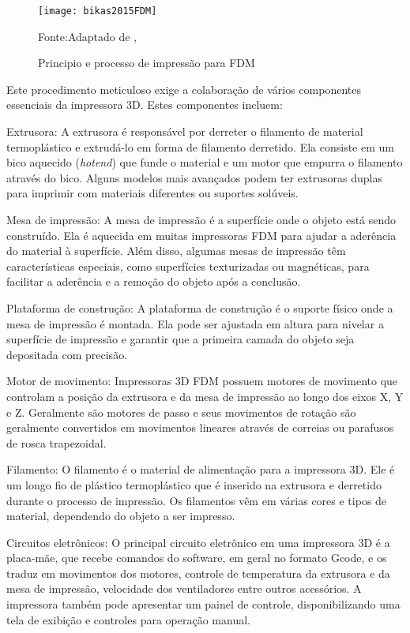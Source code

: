 \begin{figure}[H]
    \begin{center}
    \caption{Principio e processo de impressão para FDM}
    \texttt{[image: bikas2015FDM]}

    {\footnotesize Fonte:Adaptado de \citeauthor{bikas16}, \citeyear{bikas16}}
    \label{fig:fdm_ex}
    \end{center}
\end{figure}

Este procedimento meticuloso exige a colaboração de vários componentes essenciais da impressora 3D. Estes componentes incluem:

Extrusora: A extrusora é responsável por derreter o filamento de material termoplástico e extrudá-lo em forma de filamento derretido. Ela consiste em um bico aquecido (\textit{hotend}) que funde o material e um motor que empurra o filamento através do bico. Alguns modelos mais avançados podem ter extrusoras duplas para imprimir com materiais diferentes ou suportes solúveis.

Mesa de impressão: A mesa de impressão é a superfície onde o objeto está sendo construído. Ela é aquecida em muitas impressoras FDM para ajudar a aderência do material à superfície. Além disso, algumas mesas de impressão têm características especiais, como superfícies texturizadas ou magnéticas, para facilitar a aderência e a remoção do objeto após a conclusão.

Plataforma de construção: A plataforma de construção é o suporte físico onde a mesa de impressão é montada. Ela pode ser ajustada em altura para nivelar a superfície de impressão e garantir que a primeira camada do objeto seja depositada com precisão.

Motor de movimento: Impressoras 3D FDM possuem motores de movimento que controlam a posição da extrusora e da mesa de impressão ao longo dos eixos X, Y e Z. Geralmente são motores de passo e seus movimentos de rotação são geralmente convertidos em movimentos lineares através de correias ou parafusos de rosca trapezoidal.

Filamento: O filamento é o material de alimentação para a impressora 3D. Ele é um longo fio de plástico termoplástico que é inserido na extrusora e derretido durante o processo de impressão. Os filamentos vêm em várias cores e tipos de material, dependendo do objeto a ser impresso.

Circuitos eletrônicos: O principal circuito eletrônico em uma impressora 3D é a placa-mãe, que recebe comandos do software, em geral no formato Gcode, e os traduz em movimentos dos motores, controle de temperatura da extrusora e da mesa de impressão, velocidade dos ventiladores entre outros acessórios. A impressora também pode apresentar um painel de controle, disponibilizando uma tela de exibição e controles para operação manual.

